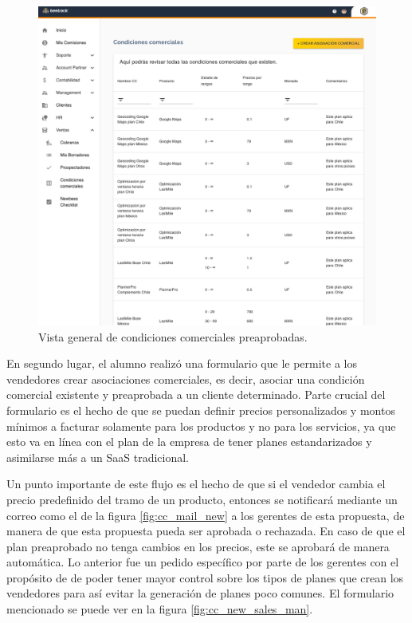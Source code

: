     \begin{figure}[H]
      \centering
      \includegraphics[width=0.6\linewidth]{figures/cc/vistas/cc_visible.png}
      \caption{Vista general de condiciones comerciales preaprobadas.}
      \label{fig:cc_visible}
    \end{figure}

    En segundo lugar, el alumno realizó una formulario que le permite a los vendedores crear asociaciones comerciales, es decir, asociar una condición comercial existente y preaprobada a un cliente determinado. Parte crucial del formulario es el hecho de que se puedan definir precios personalizados y montos mínimos a facturar solamente para los productos y no para los servicios, ya que esto va en línea con el plan de la empresa de tener planes estandarizados y asimilarse más a un SaaS tradicional. 
    
    Un punto importante de este flujo es el hecho de que si el vendedor cambia el precio predefinido del tramo de un producto, entonces se notificará mediante un correo como el de la figura \ref{fig:cc_mail_new} a los gerentes de esta propuesta, de manera de que esta propuesta pueda ser aprobada o rechazada. En caso de que el plan preaprobado no tenga cambios en los precios, este se aprobará de manera automática. Lo anterior fue un pedido específico por parte de los gerentes con el propósito de de poder tener mayor control sobre los tipos de planes que crean los vendedores para así evitar la generación de planes poco comunes. El formulario mencionado se puede ver en la figura \ref{fig:cc_new_sales_man}.

